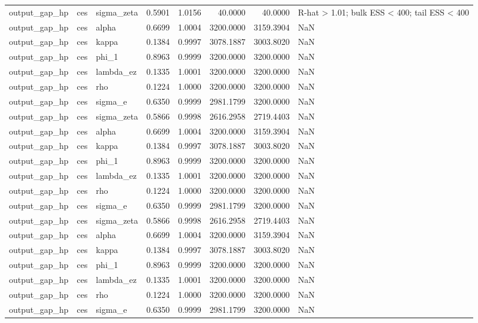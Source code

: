 \begin{tabular}{lllrrrrl}
output\_gap\_hp & ces & sigma\_zeta & 0.5901 & 1.0156 & 40.0000 & 40.0000 & R-hat > 1.01; bulk ESS < 400; tail ESS < 400 \\
output\_gap\_hp & ces & alpha & 0.6699 & 1.0004 & 3200.0000 & 3159.3904 & NaN \\
output\_gap\_hp & ces & kappa & 0.1384 & 0.9997 & 3078.1887 & 3003.8020 & NaN \\
output\_gap\_hp & ces & phi\_1 & 0.8963 & 0.9999 & 3200.0000 & 3200.0000 & NaN \\
output\_gap\_hp & ces & lambda\_ez & 0.1335 & 1.0001 & 3200.0000 & 3200.0000 & NaN \\
output\_gap\_hp & ces & rho & 0.1224 & 1.0000 & 3200.0000 & 3200.0000 & NaN \\
output\_gap\_hp & ces & sigma\_e & 0.6350 & 0.9999 & 2981.1799 & 3200.0000 & NaN \\
output\_gap\_hp & ces & sigma\_zeta & 0.5866 & 0.9998 & 2616.2958 & 2719.4403 & NaN \\
output\_gap\_hp & ces & alpha & 0.6699 & 1.0004 & 3200.0000 & 3159.3904 & NaN \\
output\_gap\_hp & ces & kappa & 0.1384 & 0.9997 & 3078.1887 & 3003.8020 & NaN \\
output\_gap\_hp & ces & phi\_1 & 0.8963 & 0.9999 & 3200.0000 & 3200.0000 & NaN \\
output\_gap\_hp & ces & lambda\_ez & 0.1335 & 1.0001 & 3200.0000 & 3200.0000 & NaN \\
output\_gap\_hp & ces & rho & 0.1224 & 1.0000 & 3200.0000 & 3200.0000 & NaN \\
output\_gap\_hp & ces & sigma\_e & 0.6350 & 0.9999 & 2981.1799 & 3200.0000 & NaN \\
output\_gap\_hp & ces & sigma\_zeta & 0.5866 & 0.9998 & 2616.2958 & 2719.4403 & NaN \\
output\_gap\_hp & ces & alpha & 0.6699 & 1.0004 & 3200.0000 & 3159.3904 & NaN \\
output\_gap\_hp & ces & kappa & 0.1384 & 0.9997 & 3078.1887 & 3003.8020 & NaN \\
output\_gap\_hp & ces & phi\_1 & 0.8963 & 0.9999 & 3200.0000 & 3200.0000 & NaN \\
output\_gap\_hp & ces & lambda\_ez & 0.1335 & 1.0001 & 3200.0000 & 3200.0000 & NaN \\
output\_gap\_hp & ces & rho & 0.1224 & 1.0000 & 3200.0000 & 3200.0000 & NaN \\
output\_gap\_hp & ces & sigma\_e & 0.6350 & 0.9999 & 2981.1799 & 3200.0000 & NaN \\

\end{tabular}
